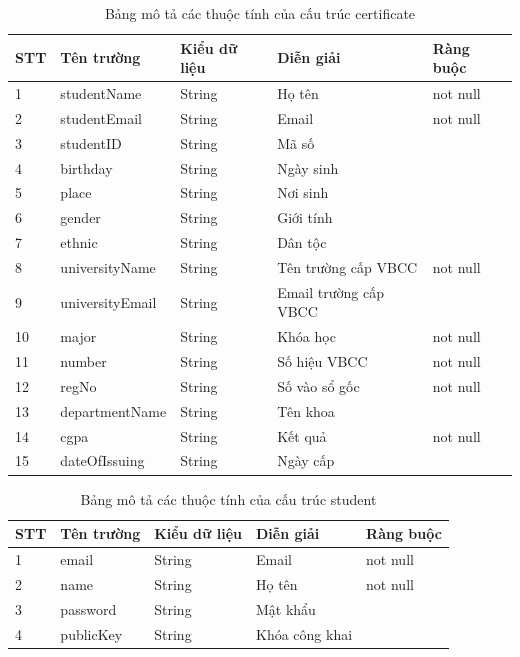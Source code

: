\begin{table}[H]
\caption{Bảng mô tả các thuộc tính của cấu trúc certificate}
	\label{table:certificate}
	\begin{tabularx} {\textwidth} {|p{1cm}|p{3cm}|p{3cm}|X|p{2cm}|}
\hline
		STT &	Tên trường & Kiểu dữ liệu & Diễn giải & Ràng buộc \\ \hline
		1 & studentName	& String & Họ tên  & not null \\ \hline
		2 & studentEmail & String  & Email   & not null \\ \hline
		3 & studentID	&  String & Mã số  & \\ \hline
		4 & birthday	& String & Ngày sinh & \\ \hline
		5 & place	& String & Nơi sinh & \\ \hline
		6 & gender & String & Giới tính & \\ \hline
		7& ethnic	& String & Dân tộc & \\ \hline
		8& universityName	& String & Tên trường cấp VBCC & not null \\ \hline
		9& universityEmail	& String & Email trường cấp VBCC&\\ \hline
		10& major 	& String & Khóa  học  & not null\\ \hline
		11& number	& String & Số hiệu VBCC & not null\\ \hline
		12& regNo	& String & Số vào sổ gốc & not null \\ \hline
		13& departmentName	& String & Tên khoa &\\ \hline
		14& cgpa	& String & Kết quả & not null \\  \hline
		15& dateOfIssuing	& String & Ngày cấp &\\ \hline
		
\end{tabularx}
\end{table}


\begin{table}[H]
\caption{Bảng mô tả các thuộc tính của cấu trúc student}
	\label{table:student}
	\begin{tabularx} {\textwidth} {|p{1cm}|p{3cm}|p{3cm}|X|p{2cm}|}
\hline
		STT &	Tên trường & Kiểu dữ liệu & Diễn giải & Ràng buộc \\ \hline
		1 & email	& String & Email  & not null \\ \hline
		2 & name & String  & Họ tên   & not null \\ \hline
		3 & password	&  String & Mật khẩu  & \\ \hline
		4 & publicKey	& String & Khóa công khai  & \\ \hline
\end{tabularx}
\end{table}


